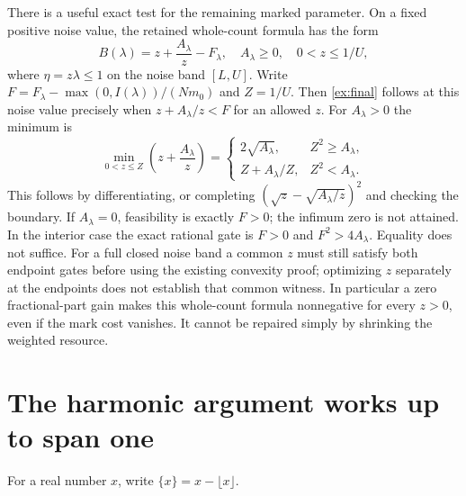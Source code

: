 There is a useful exact test for the remaining marked parameter. On a
fixed positive noise value, the retained whole-count formula has the form
\[
 B(\lambda)=z+\frac{A_\lambda}{z}-F_\lambda,
 \quad A_\lambda\ge0,\quad0<z\le1/U,
\]
where $\eta=z\lambda\le1$ on the noise band $[L,U]$.
Write $F=F_\lambda-\max(0,I(\lambda))/(Nm_0)$ and $Z=1/U$.
Then \eqref{ex:final} follows at this noise value precisely when
$z+A_\lambda/z<F$ for an allowed $z$.
For $A_\lambda>0$ the minimum is
\begin{equation}\label{ex:onevariable}
 \min_{0<z\le Z}\left(z+\frac{A_\lambda}{z}\right)
 =\begin{cases}
    2\sqrt{A_\lambda},&Z^2\ge A_\lambda,\\
    Z+A_\lambda/Z,&Z^2<A_\lambda.
   \end{cases}
\end{equation}
This follows by differentiating, or completing
$(\sqrt z-\sqrt{A_\lambda/z})^2$ and checking the boundary.
If $A_\lambda=0$, feasibility is exactly $F>0$; the infimum zero is
not attained. In the interior case the exact rational gate is
$F>0$ and $F^2>4A_\lambda$. Equality does not suffice.
For a full closed noise band a common $z$ must still satisfy both
endpoint gates before using the existing convexity proof; optimizing $z$
separately at the endpoints does not establish that common witness.
In particular a zero fractional-part gain makes this whole-count formula
nonnegative for every $z>0$, even if the mark cost vanishes. It cannot be
repaired simply by shrinking the weighted resource.

\section{The harmonic argument works up to span one}
For a real number $x$, write $\{x\}=x-\lfloor x\rfloor$.

